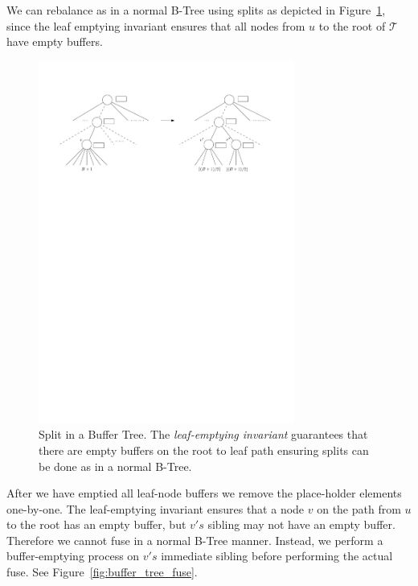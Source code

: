 \documentclass[twoside,11pt,openright]{report}
\begin{document}
We can rebalance as in a normal B-Tree using splits as depicted in Figure~\ref{fig:buffer_tree_split}, since the leaf emptying invariant ensures that all nodes from $u$ to the root of $\mathcal{T}$ have empty buffers.

\begin{figure}[H]
	\centering
	\includegraphics[width=0.75\textwidth]{../figures/buffer_tree_split}
	\caption{Split in a Buffer Tree. The \textit{leaf-emptying invariant} guarantees that there are empty buffers on the root to leaf path ensuring splits can be done as in a normal B-Tree.}
	\label{fig:buffer_tree_split}
\end{figure}

After we have emptied all leaf-node buffers we remove the place-holder elements one-by-one. The leaf-emptying invariant ensures that a node $v$ on the path from $u$ to the root has an empty buffer, but $v's$ sibling may not have an empty buffer. Therefore we cannot fuse in a normal B-Tree manner. Instead, we perform a buffer-emptying process on $v's$ immediate sibling before performing the actual fuse. See Figure~\ref{fig:buffer_tree_fuse}.
\end{document}
